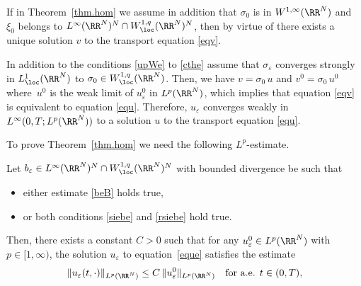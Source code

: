 \begin{Rem}\label{rem.uni}
If in Theorem~\ref{thm.hom} we assume in addition that $\sigma_0$ is in $W^{1,\infty}(\RR^N)$ and~$\xi_0$ belongs to $L^\infty(\RR^N)^N\cap W^{1,q}_\loc(\RR^N)^N$, then by virtue of \cite[Cor.\,II.1]{DiLi} there exists a unique solution $v$ to the transport equation \eqref{eqv}.
\end{Rem}
\begin{Rem}\label{rem.vsiu}
In addition to the conditions \eqref{upWe} to \eqref{cthe} assume that $\sigma_\varepsilon$ converges strongly in $L^1_\loc(\RR^N)$ to $\sigma_0\in W^{1,q}_\loc(\RR^N)$. Then, we have $v=\sigma_0\,u$ and $v^0=\sigma_0\,u^0$ where~$u^0$ is the weak limit of $u_\varepsilon^0$ in $L^p(\RR^N)$, which implies that equation \eqref{eqv} is equivalent to equation \eqref{equ}. Therefore, $u_\varepsilon$ converges weakly in $L^\infty(0,T;L^p(\RR^N))$ to a solution $u$ to the transport equation \eqref{equ}.
\end{Rem}
To prove Theorem~\ref{thm.hom} we need the following $L^p$-estimate.
\begin{Lem}\label{lem.Lpeue}
Let $b_\varepsilon\in L^\infty(\RR^N)^N\cap W^{1,q}_\loc(\RR^N)^N$ with bounded divergence be such that
\begin{itemize}
\item either estimate \eqref{beB} holds true,
\item or both conditions \eqref{siebe} and \eqref{rsiebe} hold true.
\end{itemize}
Then, there exists a constant $C>0$ such that for any $u_\varepsilon^0\in L^p(\RR^N)$ with $p\in[1,\infty)$, the solution $u_\varepsilon$ to equation~\eqref{eque} satisfies the estimate
\begin{equation}\label{Lpeue}
\|u_\varepsilon(t,\cdot)\|_{L^p(\RR^N)}\leq C\,\|u_\varepsilon^0\|_{L^p(\RR^N)}\quad\mbox{for a.e. }t\in(0,T),
\end{equation}
\end{Lem}

